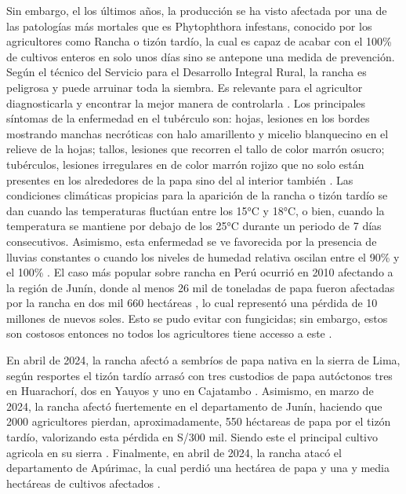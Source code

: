  Sin embargo, el los últimos años, la producción se ha visto afectada por una de las patologías más mortales que es Phytophthora infestans, conocido por los agricultores como Rancha o tizón tardío, la cual es capaz de acabar con el 100\% de cultivos enteros en solo unos días sino se antepone una medida de prevención. Según el técnico del Servicio para el Desarrollo Integral Rural,   la rancha es peligrosa y puede arruinar  toda la siembra. Es relevante para el agricultor diagnosticarla y encontrar la mejor manera de controlarla \parencite{cr_rancha1}. Los principales síntomas de la enfermedad en el tubérculo son: hojas, lesiones en los bordes mostrando manchas necróticas con halo amarillento y micelio blanquecino en el relieve de la hojas; tallos, lesiones que recorren el tallo de color marrón osucro; tubérculos, lesiones irregulares en de color marrón rojizo que no solo están presentes en los alrededores de la papa sino del al interior también \parencite{cr_rancha2}. Las condiciones climáticas propicias para la aparición de la rancha o tizón tardío se dan cuando las temperaturas fluctúan entre los 15°C y 18°C, o bien, cuando la temperatura se mantiene por debajo de los 25°C durante un periodo de 7 días consecutivos. Asimismo, esta enfermedad se ve favorecida por la presencia de lluvias constantes o cuando los niveles de humedad relativa oscilan entre el 90\% y el 100\% \parencite{cr_rancha1}. El caso más popular sobre rancha en Perú ocurrió en 2010 afectando a la región de Junín, donde al menos 26 mil de toneladas de papa fueron afectadas por la rancha en dos mil 660 hectáreas , lo cual representó una pérdida de 10 millones de nuevos soles. Esto se pudo evitar con fungicidas; sin embargo, estos son costosos entonces no todos los agricultores tiene accesso a este \parencite{cr_rancha6}. 
 
 En abril de 2024, la rancha afectó a sembríos de papa nativa en la sierra de Lima, según resportes el tizón tardío arrasó con tres custodios de papa autóctonos tres en Huarachorí, dos en Yauyos y uno en Cajatambo \parencite{cr_rancha3}. Asimismo, en marzo de 2024, la rancha afectó fuertemente en el departamento de Junín, haciendo que 2000 agricultores pierdan, aproximadamente, 550 héctareas de papa por el tizón tardío, valorizando esta pérdida en S/300 mil. Siendo este el principal cultivo agricola en su sierra \parencite{cr_rancha4}. Finalmente, en abril de 2024, la rancha atacó el departamento de Apúrimac, la cual perdió una hectárea de papa y una y media hectáreas de cultivos afectados \parencite{cr_rancha5}.
 
